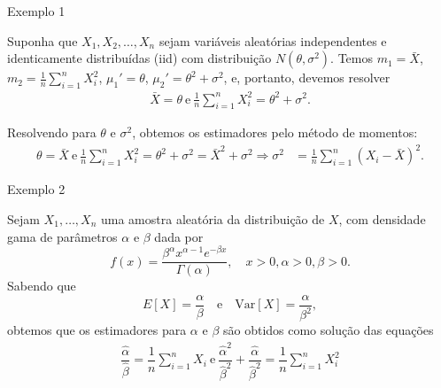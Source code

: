 \documentclass[12pt]{beamer}
\begin{document}
\begin{frame}{Exemplo 1}
\begin{block}{}
\justifying
Suponha que \(X_1, X_2, \ldots, X_n\) sejam variáveis aleatórias independentes e identicamente distribuídas (iid) com distribuição \(N(\theta, \sigma^2)\). Temos \(m_1 = \bar{X}\), \(m_2 = {\displaystyle \frac{1}{n} \sum_{i=1}^{n} X_i^2}\), \(\mu_1' = \theta\), \(\mu_2' = \theta^{2}+\sigma^2\), e, portanto, devemos resolver
\begin{align*}
\bar{X} = \theta~\text{e}~{\displaystyle \frac{1}{n} \sum_{i=1}^{n} X_i^2} = \theta^{2}+\sigma^2.
\end{align*}

Resolvendo para \(\theta\) e \(\sigma^2\), obtemos os estimadores pelo método de momentos:
\begin{align*}
\theta = \bar{X}~\text{e}~{\displaystyle \frac{1}{n} \sum_{i=1}^{n}X_{i}^{2}=\theta^{2}+\sigma^{2}}=\bar{X}^{2}+\sigma^{2}\Rightarrow \sigma^2 &= \frac{1}{n} \sum_{i=1}^{n} (X_i - \bar{X})^2.
\end{align*}
\end{block}
\end{frame}

\begin{frame}{Exemplo 2}
\begin{block}{}
\justifying
Sejam \(X_1, \ldots, X_n\) uma amostra aleatória da distribuição de \(X\), com densidade gama de parâmetros \(\alpha\) e \(\beta\) dada por
\[
f(x) = \frac{\beta^\alpha x^{\alpha-1} e^{-\beta x}}{\Gamma(\alpha)}, \quad x > 0, \alpha > 0, \beta > 0.
\]
Sabendo que
\[
E[X] = \frac{\alpha}{\beta} \quad \text{e} \quad \text{Var}[X] = \frac{\alpha}{\beta^2},
\]
obtemos que os estimadores para \(\alpha\) e \(\beta\) são obtidos como solução das equações
\begin{align*}
\dfrac{\hat{\alpha}}{\hat{\beta}}=\dfrac{1}{n}{\displaystyle \sum_{i=1}^{n}X_{i}}~\text{e}~\dfrac{\hat{\alpha}^{2}}{\hat{\beta}^{2}}+\dfrac{\hat{\alpha}}{\hat{\beta}^{2}}=\dfrac{1}{n}{\displaystyle \sum_{i=1}^{n}X_{i}^{2}}
\end{align*}
\end{block}
\end{frame}
\end{document}
